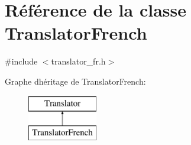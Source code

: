 \hypertarget{class_translator_french}{}\section{Référence de la classe Translator\+French}
\label{class_translator_french}


{\ttfamily \#include $<$translator\+\_\+fr.\+h$>$}

Graphe d\textquotesingle{}héritage de Translator\+French\+:\begin{figure}[H]
\begin{center}
\leavevmode
\includegraphics[height=2.000000cm]{class_translator_french}
\end{center}
\end{figure}
